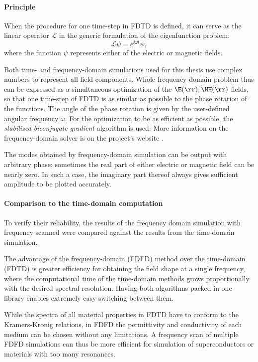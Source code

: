 \paragraph{Principle}  %
When the procedure for one time-step in FDTD is defined, it can serve as the linear operator $\mathcal L$ in the generic formulation of the eigenfunction problem:
$$\mathcal{L} \psi = e^{\ii \omega t} \psi,$$
where the function $\psi$ represents either of the electric or magnetic fields. 

Both time- and frequency-domain simulations used for this thesis use complex numbers to represent all field components.
Whole frequency-domain problem thus can be expressed as a simultaneous optimization of the $\E(\rr), \HH(\rr)$ fields, so that one time-step of FDTD is as similar as possible to the phase rotation of the functions. The angle of the phase rotation is given by the user-defined angular frequency $\omega$. For the optimization to be as efficient as possible, the \textit{stabilized biconjugate gradient} algorithm \cite{oskooi2010meep} is used. More information on the frequency-domain solver is on the project's website \cite{ab-initio}. 

The modes obtained by frequency-domain simulation can be output with arbitrary phase; sometimes the real part of either electric or magnetic field can be nearly zero. In such a case, the imaginary part thereof always gives sufficient amplitude to be plotted accurately.

\paragraph{Comparison to the time-domain computation} %
To verify their reliability, the results of the frequency domain simulation with frequency scanned were compared against the results from the time-domain simulation. 

The advantage of the frequency-domain (FDFD) method over the time-domain (FDTD) is greater efficiency for obtaining the field shape at a single frequency, where the computational time of the time-domain methods grows proportionally with the desired spectral resolution. Having both algorithms packed in one library enables extremely easy switching between them. 

While the spectra of all material properties in FDTD have to conform to the Kramers-Kronig relations, in FDFD the permittivity and conductivity of each medium can be chosen without any limitations.
A frequency scan of multiple FDFD simulations can thus be more efficient for simulation of superconductors or materials with too many resonances.  

